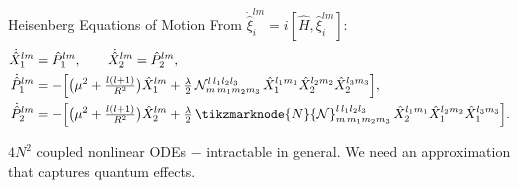 \documentclass{beamer}
\begin{document}
\begin{frame}{Heisenberg Equations of Motion}
  From $\dot{\hat\xi}_i^{lm}=i[\hat H,\hat\xi_i^{lm}]$:
  \begin{align*}
    \dot{\hat X}_1^{lm} &= \hat P_1^{lm}, \qquad \dot{\hat X}_2^{lm} = \hat P_2^{lm}, \\
    \dot{\hat P}_1^{lm} &= -\Big[\big(\mu^2 + \tfrac{l(l+1)}{R^2}\big)\hat X_1^{lm}
      + \tfrac{\lambda}{2}\,\mathcal{N}^{l\,l_1 l_2 l_3}_{m\,m_1 m_2 m_3}\,
        \hat X_1^{l_1 m_1}\hat X_2^{l_2 m_2}\hat X_2^{l_3 m_3}\Big], \\
    \dot{\hat P}_2^{lm} &= -\Big[\big(\mu^2 + \tfrac{l(l+1)}{R^2}\big)\hat X_2^{lm}
      + \tfrac{\lambda}{2}\,\tikzmarknode{N}{\mathcal{N}}^{l\,l_1 l_2 l_3}_{m\,m_1 m_2 m_3}\,
        \hat X_2^{l_1 m_1}\hat X_1^{l_2 m_2}\hat X_1^{l_3 m_3}\Big].
  \end{align*}

  \vspace{1.4cm}

  {\footnotesize $4N^2$ coupled nonlinear ODEs $-$ intractable in general. We need an approximation that captures quantum effects.}
\end{frame}
\end{document}
